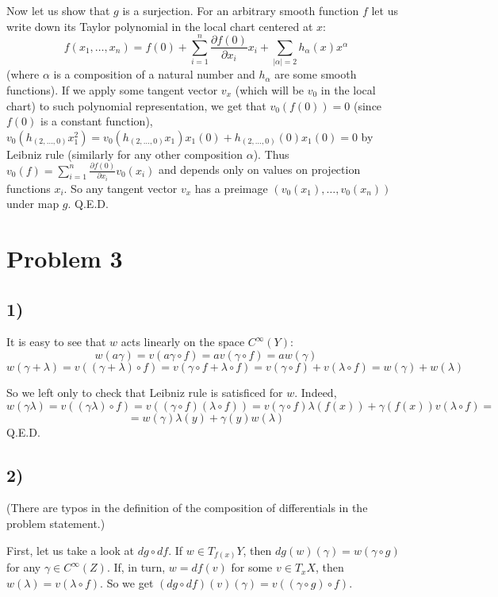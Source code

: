 \documentclass{article}[14pt]
\begin{document}
Now let us show that $g$ is a surjection.
For an arbitrary smooth function $f$ let us write down its Taylor polynomial in the local chart centered at $x$:
$$f(x_1, \dots, x_n) = f(0) + \sum_{i=1}^n \frac{\partial f(0)}{\partial x_i}x_i + \sum_{|\alpha| = 2} h_\alpha (x) x^\alpha$$
(where $\alpha$ is a composition of a natural number and $h_\alpha$ are some smooth functions).
If we apply some tangent vector $v_x$ (which will be $v_0$ in the local chart) to such polynomial representation, we get that $v_0(f(0)) = 0$ (since $f(0)$ is a constant function), 
$v_0(h_{(2, \dots, 0)}x_1^2) = v_0(h_{(2, \dots, 0)}x_1)x_1(0) + h_{(2, \dots, 0)}(0)x_1(0) = 0$ by Leibniz rule
(similarly for any other composition $\alpha$).
Thus $v_0(f) = \sum_{i = 1}^n \frac{\partial f(0)}{\partial x_i} v_0(x_i)$ and depends only on values on projection functions $x_i$.
So any tangent vector $v_x$ has a preimage $(v_0(x_1), \dots, v_0(x_n))$ under map $g$. Q.E.D.

\section{Problem 3}

\subsection{1)}

It is easy to see that $w$ acts linearly on the space $C^\infty (Y)$: 
$$w(a \gamma) = v(a \gamma \circ f) = a v(\gamma \circ f) = a w(\gamma)$$
$$w(\gamma + \lambda) = v((\gamma + \lambda) \circ f) = v (\gamma \circ f + \lambda \circ f) = v(\gamma \circ f) + v(\lambda \circ f) = w(\gamma) + w(\lambda)$$

So we left only to check that Leibniz rule is satisficed for $w$.
Indeed,
$$w(\gamma \lambda) = v((\gamma \lambda) \circ f) = v((\gamma \circ f)(\lambda \circ f)) = v(\gamma \circ f) \lambda(f(x)) + \gamma(f(x)) v(\lambda \circ f) =$$ 
$$= w(\gamma) \lambda(y) + \gamma(y) w(\lambda)$$
Q.E.D.

\subsection{2)}
(There are typos in the definition of the composition of differentials in the problem statement.)

First, let us take a look at $dg \circ df$.
If $w \in T_{f(x)}Y$, then $dg(w)(\gamma) = w(\gamma \circ g)$ for any $\gamma \in C^\infty(Z)$.
If, in turn, $w = df(v)$ for some $v \in T_x X$, then $w(\lambda) = v(\lambda \circ f)$.
So we get $(dg \circ df)(v)(\gamma) = v((\gamma \circ g) \circ f)$.
\end{document}
